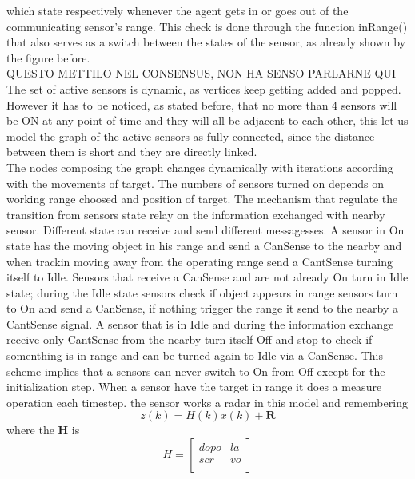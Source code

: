 \documentclass{article}
\begin{document}
\begin{multicols}{2}
    which state respectively whenever the agent gets in or goes out of the communicating sensor's range. This check is done through the 
    function inRange() that also serves as a switch between the states of the sensor, as already shown by the figure before.
    \\
    QUESTO METTILO NEL CONSENSUS, NON HA SENSO PARLARNE QUI
    \\
    The set of active sensors is dynamic, as vertices keep getting added and popped. However it has to be noticed, as stated before, that no 
    more than 4 sensors will be ON at any point of time and they will all be adjacent to each other, this let us model the graph of the active 
    sensors as fully-connected, since the distance between them is short and they are directly linked.
    \\
    The nodes composing the graph changes dynamically with iterations according with the movements of target. The numbers of
    sensors turned on depends on working range choosed and position of target. The mechanism that regulate the transition from sensors state
    relay on the information exchanged with nearby sensor. Different state can receive and send different messagesses. A sensor in On state has the moving
    object in his range and send a CanSense to the nearby and when trackin moving away from the operating range send a CantSense turning itself to Idle.
    Sensors that receive a CanSense and are not already On turn in Idle state; during the Idle state sensors check
    if object appears in range sensors turn to On and send a CanSense, if nothing trigger the range it send to the nearby a CantSense signal.
    A sensor that is in Idle and during the information exchange receive only CantSense from the nearby turn itself Off and stop to check if somenthing is in range and
    can be turned again to Idle via a CanSense. This scheme implies that a sensors can never switch to On from Off except for the initialization step.
    When a sensor have the target in range it does a measure operation each timestep. the sensor works a radar in this model and remembering
    \begin{equation}
        z(k)=H(k)x(k)+\textbf{R}
    \end{equation}
    where the \textbf{H} is
    \begin{equation}
        H= \begin{bmatrix}
            dopo & la \\
            scr  & vo \\
        \end{bmatrix}
    \end{equation}

\end{multicols}
\end{document}
